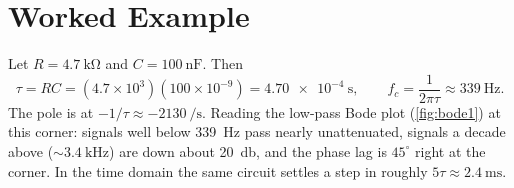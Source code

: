 \section{Worked Example}
Let \(R=\SI{4.7}{\kilo\ohm}\) and \(C=\SI{100}{\nano\farad}\). Then
\[
\tau=RC=(4.7\times10^3)(100\times10^{-9})=\SI{4.70e-4}{\second},
\qquad
f_c=\frac{1}{2\pi\tau}\approx\SI{339}{\hertz}.
\]
The pole is at \(-1/\tau\approx-\SI{2130}{\per\second}\). Reading the low-pass
Bode plot (\cref{fig:bode1}) at this corner: signals well below \SI{339}{\hertz}
pass nearly unattenuated, signals a decade above (\(\sim\!\SI{3.4}{\kilo\hertz}\))
are down about \SI{20}{\decibel}, and the phase lag is \(45^\circ\) right at the
corner. In the time domain the same circuit settles a step in roughly
\(5\tau\approx\SI{2.4}{\milli\second}\).
